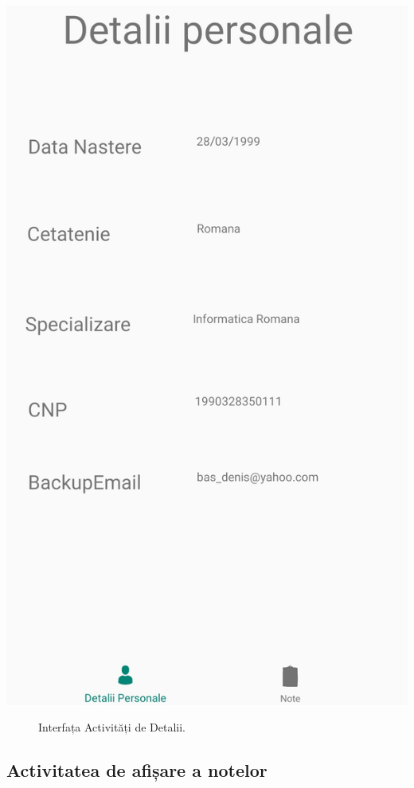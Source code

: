 \documentclass{article}
\begin{document}
	\begin{center}
		\includegraphics[scale=0.15]{Source/UVTDetalii}
		\begin{figure}[!h]
			{\caption*{Interfața Activități de Detalii.}}
		\end{figure}
	\end{center}

		\subsection{Activitatea de afișare a notelor}
\end{document}
